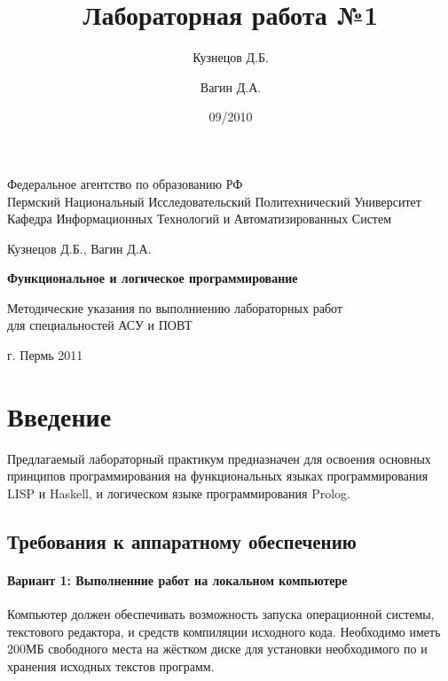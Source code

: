 \documentclass[a4paper,12pt]{article}
\title{Лабораторная работа №1}
\author{Кузнецов Д.Б.\and Вагин Д.А.}
\date{09/2010}
\begin{document}
\begin{titlepage}
\newpage

\begin{center}
Федеральное агентство по образованию РФ\\
Пермский Национальный Исследовательский Политехнический Университет\\
Кафедра Информационных Технологий и Автоматизированных Систем
\end{center}

\vspace{8em}

\begin{center}
\Large Кузнецов Д.Б., Вагин Д.А.
\end{center}

\vspace{2em}

\begin{center}
\Huge \textbf{Функциональное и логическое программирование}
\end{center}
\begin{center}
Методические указания по выполниению лабораторных работ\\
для специальностей АСУ и ПОВТ
\end{center}



\vspace{\fill}

\begin{center}
г. Пермь 2011
\end{center}

\end{titlepage}

\newpage
\section{Введение}
Предлагаемый лабораторный практикум предназначен для освоения 
основных принципов программирования на функциональных языках программирования 
LISP и Haskell, и логическом языке программирования Prolog.

\subsection{Требования к аппаратному обеспечению}

\paragraph{Вариант 1: Выполненние работ на локальном компьютере}
Компьютер должен обеспечивать возможность запуска операционной системы, текстового редактора, и средств компиляции исходного кода. Необходимо иметь 200МБ свободного места на жёстком диске для установки необходимого по и хранения исходных текстов программ.
\end{document}
